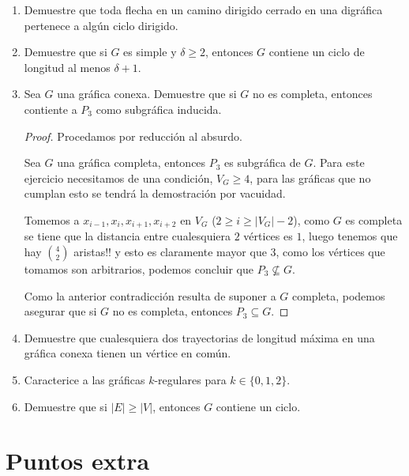 \documentclass{article}
\begin{document}
\begin{enumerate}
  \small
\item Demuestre que toda flecha en un camino dirigido cerrado en una  digr\'afica
  pertenece a alg\'un ciclo dirigido.
\item Demuestre que si $G$ es simple y $\delta \ge 2$, entonces $G$ contiene
  un ciclo de longitud al menos $\delta + 1$.
\item Sea $G$ una gr\'afica conexa.   Demuestre que si $G$ no es completa,
  entonces contiente a $P_3$ como subgr\'afica inducida.
  \renewcommand\qedsymbol{QED}
  \begin{proof}
    Procedamos por reducción al absurdo.

    Sea $G$ una gráfica completa, entonces $P_{3}$ es subgráfica de $G$. Para este
    ejercicio necesitamos de una condición, $V_G \ge 4$, para las gráficas que no
    cumplan esto se tendrá la demostración por vacuidad.

    Tomemos a $x_{i - 1}, x_{i}, x_{i + 1}, x_{i + 2}$ en $V_{G}$ ($2 \ge i \ge
    |V_{G}| - 2$), como $G$ es completa se tiene que la distancia entre cualesquiera
    $2$ v\'ertices es $1$, luego tenemos que hay ${4 \choose 2}$ aristas!! y esto es
    claramente mayor que $3$, como los vértices que tomamos son arbitrarios, podemos
    concluir que $P_{3} \nsubseteq G$.
    
    Como la anterior contradicción resulta de suponer a $G$ completa, podemos
    asegurar que si $G$ no es completa, entonces $P_3 \subseteq G$.
  \end{proof}
\item Demuestre que cualesquiera dos trayectorias de longitud m\'axima en una
  gr\'afica conexa tienen un vértice en común.
\item Caracterice a las gr\'aficas $k$-regulares para $k \in \{ 0, 1, 2 \}$.
\item Demuestre que si $|E| \ge |V|$, entonces $G$ contiene un ciclo.
\end{enumerate}

\section*{Puntos extra}
\end{document}
